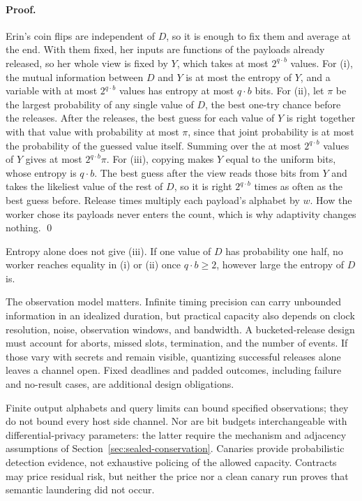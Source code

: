 \documentclass[11pt,a4paper]{article}
\theoremstyle{definition}
\begin{document}
\paragraph{Proof.}
Erin's coin flips are independent of $D$, so it is enough to fix them and
average at the end. With them fixed, her inputs are functions of the payloads
already released, so her whole view is fixed by $Y$, which takes at most
$2^{q\cdot b}$ values. For (i), the mutual information between $D$ and $Y$ is
at most the entropy of $Y$, and a variable with at most $2^{q\cdot b}$ values
has entropy at most $q\cdot b$ bits. For (ii), let $\pi$ be the largest
probability of any single value of $D$, the best one-try chance before the
releases. After the releases, the best guess for each value of $Y$ is right
together with that value with probability at most $\pi$, since that joint
probability is at most the probability of the guessed value itself. Summing
over the at most $2^{q\cdot b}$ values of $Y$ gives at most $2^{q\cdot b}\pi$.
For (iii), copying makes $Y$ equal to the uniform bits, whose entropy is
$q\cdot b$. The best guess after the view reads those bits from $Y$ and takes
the likeliest value of the rest of $D$, so it is right $2^{q\cdot b}$ times
as often as the best guess before. Release times multiply each payload's
alphabet by $w$. How the worker chose its payloads never enters the count,
which is why adaptivity changes nothing. \qed

Entropy alone does not give (iii). If one value of $D$ has probability one
half, no worker reaches equality in (i) or (ii) once $q\cdot b\ge2$, however
large the entropy of $D$ is.

The observation model matters. Infinite timing precision can carry unbounded
information in an idealized duration, but practical capacity also depends on
clock resolution, noise, observation windows, and bandwidth. A bucketed-release
design must account for aborts, missed slots, termination, and the number of
events. If those vary with secrets and remain visible, quantizing successful
releases alone leaves a channel open. Fixed deadlines and padded outcomes,
including failure and no-result cases, are additional design obligations.

Finite output alphabets and query limits can bound specified observations;
they do not bound every host side channel. Nor are bit budgets interchangeable
with differential-privacy parameters: the latter require the mechanism and
adjacency assumptions of Section~\ref{sec:sealed-conservation}. Canaries provide
probabilistic detection evidence, not exhaustive policing of the allowed
capacity. Contracts may price residual risk, but neither the price nor a clean
canary run proves that semantic laundering did not occur.
\end{document}
